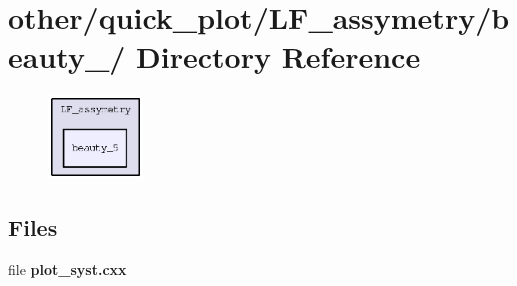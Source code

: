 \section{other/quick\_\-plot/LF\_\-assymetry/beauty\_/ Directory Reference}
\label{dir_c898eeede3669e69408f9cd937ab37be}


\begin{figure}[H]
\begin{center}
\leavevmode
\includegraphics[width=71pt]{dir_c898eeede3669e69408f9cd937ab37be_dep}
\end{center}
\end{figure}
\subsection*{Files}
\begin{CompactItemize}
\item 
file \textbf{plot\_\-syst.cxx}
\end{CompactItemize}
